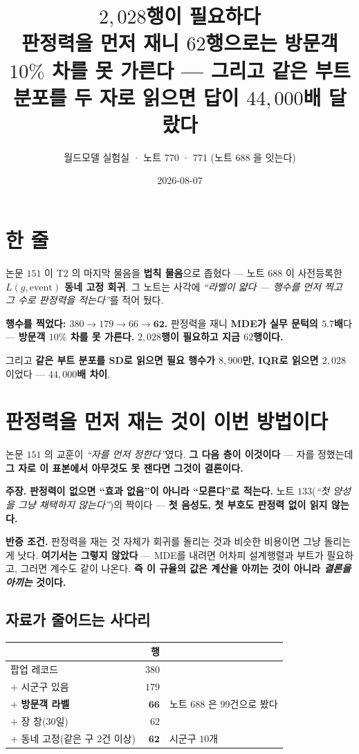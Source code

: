 \documentclass[10pt,a4paper]{article}
\title{\bfseries $2{,}028$행이 필요하다\\[2pt]
\large 판정력을 먼저 재니 $62$행으로는 방문객 $10\%$ 차를 못 가른다 --- 그리고 같은
부트 분포를 두 자로 읽으면 답이 $44{,}000$배 달랐다}
\author{월드모델 실험실 · 노트 770 · 771 (노트 688 을 잇는다)}
\date{2026-08-07}
\newcommand{\claim}[2]{\begin{claimbox}\textbf{주장.} #1\par\smallskip
  \textcolor{gray!70}{\textbf{반증 조건.} #2}\end{claimbox}}
\begin{document}
\maketitle

\section{한 줄}

논문 $151$ 이 T2 의 마지막 물음을 \textbf{법칙 물음}으로 좁혔다 --- 노트 $688$ 이
사전등록한 \textbf{$L(g, \text{event})$ 동네 고정 회귀}. 그 노트는 사각에
\emph{``라벨이 얇다 --- 행수를 먼저 찍고 그 수로 판정력을 적는다''}를 적어 뒀다.

\textbf{행수를 찍었다: $380 \to 179 \to 66 \to \mathbf{62}$.} 판정력을 재니
\textbf{MDE가 실무 문턱의 $5.7$배}다 --- \textbf{방문객 $10\%$ 차를 못 가른다.}
\textbf{$2{,}028$행이 필요하고 지금 $62$행이다.}

그리고 \textbf{같은 부트 분포를 SD로 읽으면 필요 행수가 $8{,}900$만, IQR로 읽으면
$2{,}028$} 이었다 --- \textbf{$44{,}000$배 차이}.

\section{판정력을 먼저 재는 것이 이번 방법이다}

논문 $151$ 의 교훈이 \emph{``자를 먼저 정한다''}였다. \textbf{그 다음 층이 이것이다}
--- 자를 정했는데 \textbf{그 자로 이 표본에서 아무것도 못 잰다면 그것이 결론이다.}

\claim{\textbf{판정력이 없으면 ``효과 없음''이 아니라 ``모른다''로 적는다.} 노트
$133$(\emph{``첫 양성을 그냥 채택하지 않는다''})의 짝이다 --- \textbf{첫 음성도, 첫
부호도 판정력 없이 읽지 않는다.}}
{판정력을 재는 것 자체가 회귀를 돌리는 것과 비슷한 비용이면 그냥 돌리는 게 낫다.
\textbf{여기서는 그렇지 않았다} --- MDE를 내려면 어차피 설계행렬과 부트가 필요하고,
그러면 계수도 같이 나온다. \textbf{즉 이 규율의 값은 계산을 아끼는 것이 아니라
\emph{결론을 아끼는} 것이다.}}

\subsection*{자료가 줄어드는 사다리}

\begin{center}
\begin{tabular}{lrl}
\toprule
& 행 & \\
\midrule
팝업 레코드 & $380$ & \\
$+$ 시군구 있음 & $179$ & \\
$+$ \textbf{방문객 라벨} & $\mathbf{66}$ & 노트 $688$ 은 $99$건으로 봤다 \\
$+$ 장 창($30$일) & $62$ & \\
$+$ 동네 고정(같은 구 $2$건 이상) & $\mathbf{62}$ & 시군구 $10$개 \\
\bottomrule
\end{tabular}
\end{center}
\end{document}
